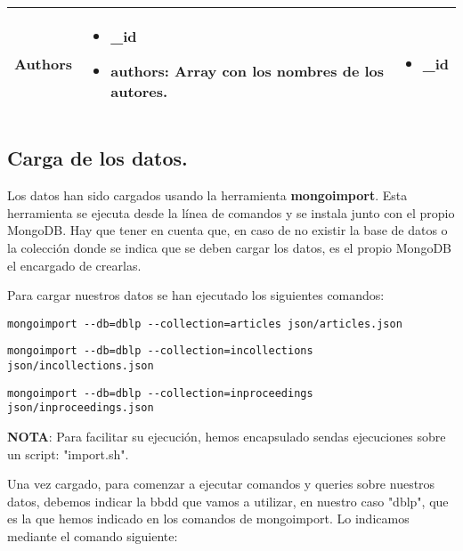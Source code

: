 \begin{center}
\begin{tabular}{ | l | l | l |}
    Authors &
    \begin{minipage}[t]{0.4\textwidth}
      \begin{itemize}
	\item \_id
	\item authors: Array con los nombres de los autores.
      \end{itemize}
    \end{minipage} & 
    \begin{minipage}[t]{0.3\textwidth}
      \begin{itemize}
	\item \_id
      \end{itemize} 
    \end{minipage}  \\ \hline
  \end{tabular}
\end{center}

\subsection{Carga de los datos.}

Los datos han sido cargados usando la herramienta \textbf{mongoimport}. Esta herramienta se ejecuta desde la línea de comandos y se instala junto con el propio MongoDB. Hay que tener en cuenta que, en caso de no existir la base de datos o la colección donde se indica que se deben cargar los datos, es el propio MongoDB el encargado de crearlas.

Para cargar nuestros datos se han ejecutado los siguientes comandos:

\begin{verbatim}
mongoimport --db=dblp --collection=articles json/articles.json
\end{verbatim}

\begin{verbatim}
mongoimport --db=dblp --collection=incollections json/incollections.json
\end{verbatim}

\begin{verbatim}
mongoimport --db=dblp --collection=inproceedings json/inproceedings.json
\end{verbatim}

\textbf{NOTA}: Para facilitar su ejecución, hemos encapsulado sendas ejecuciones sobre un script: "import.sh".

Una vez cargado, para comenzar a ejecutar comandos y queries sobre nuestros datos, debemos indicar la bbdd que vamos a utilizar, en nuestro caso "dblp", que es la que hemos indicado en los comandos de mongoimport. Lo indicamos mediante el comando siguiente:


